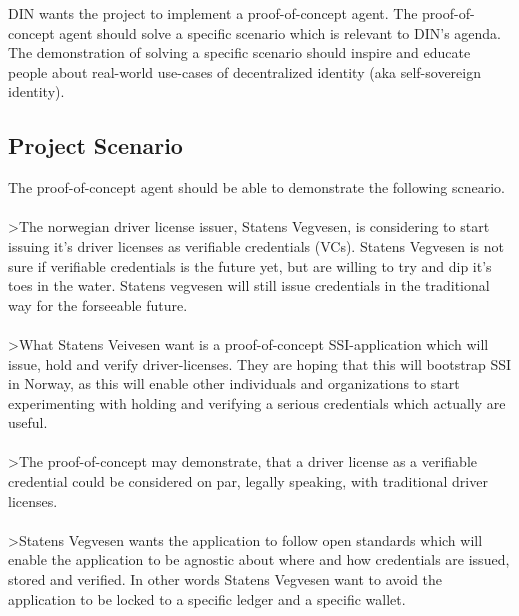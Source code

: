 DIN wants the project to implement a proof-of-concept agent. The proof-of-concept agent should solve a specific scenario which is relevant to DIN's agenda. The demonstration of solving a specific scenario should inspire and educate people about real-world use-cases of decentralized identity (aka self-sovereign identity).

\subsection{Project Scenario}

The proof-of-concept agent should be able to demonstrate the following scneario.

\paragraph{}
>The norwegian driver license issuer, Statens Vegvesen, is considering to start issuing it's driver licenses as verifiable credentials (VCs). Statens Vegvesen is not sure if verifiable credentials is the future yet, but are willing to try and dip it's toes in the water. Statens vegvesen will still issue credentials in the traditional way for the forseeable future.

\paragraph{}
>What Statens Veivesen want is a proof-of-concept SSI-application which will issue, hold and verify driver-licenses. They are hoping that this will bootstrap SSI in Norway, as this will enable other individuals and organizations to start experimenting with holding and verifying a serious credentials which actually are useful.

\paragraph{}
>The proof-of-concept may demonstrate, that a driver license as a verifiable credential could be considered on par, legally speaking, with traditional driver licenses.


\paragraph{}
>Statens Vegvesen wants the application to follow open standards which will enable the application to be agnostic about where and how credentials are issued, stored and verified. In other words Statens Vegvesen want to avoid the application to be locked to a specific ledger and a specific wallet.


